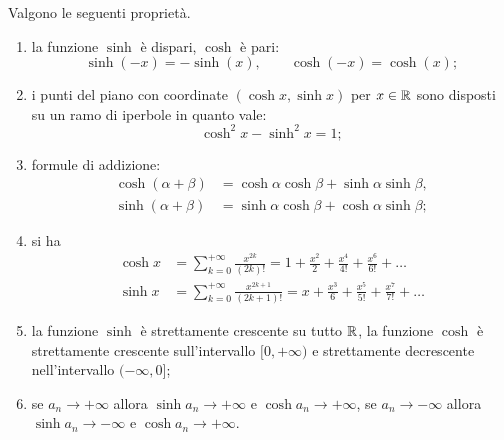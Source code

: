 \begin{theorem}
Valgono le seguenti proprietà.
\begin{enumerate}
\item
la funzione $\sinh$ è dispari, $\cosh$ è pari:
\[
\sinh(-x) = -\sinh(x),
\qquad
\cosh(-x) = \cosh(x);
\]

\item
i punti del piano con coordinate $(\cosh x, \sinh x)$
per $x\in \mathbb R$
sono disposti su un ramo di iperbole in quanto vale:
\[
  \cosh^2 x - \sinh^2 x = 1;
\]

\item formule di addizione:
\begin{align*}
  \cosh(\alpha+\beta) &= \cosh \alpha \cosh \beta + \sinh \alpha \sinh \beta,\\
  \sinh(\alpha+\beta) &= \sinh \alpha \cosh \beta + \cosh \alpha \sinh \beta;
\end{align*}

\item si ha
\begin{align*}
 \cosh x
 &= \sum_{k=0}^{+\infty} \frac{x^{2k}}{(2k)!}
 = 1 + \frac{x^2}{2} + \frac{x^4}{4!} + \frac{x^6}{6!} + \dots \\
 \sinh x
 &= \sum_{k=0}^{+\infty} \frac{x^{2k+1}}{(2k+1)!}
 = x + \frac{x^3}{6} + \frac{x^5}{5!} + \frac{x^7}{7!} + \dots
\end{align*}

\item
la funzione $\sinh$ è strettamente crescente su tutto $\mathbb R$,
la funzione $\cosh$
è strettamente crescente sull'intervallo
$[0,+\infty)$ e strettamente decrescente
nell'intervallo $(-\infty,0]$;

\item
se $a_n\to +\infty$ allora $\sinh a_n \to +\infty$ e $\cosh a_n \to +\infty$,
se $a_n\to -\infty$ allora $\sinh a_n \to -\infty$ e $\cosh a_n \to +\infty$.

\end{enumerate}
\end{theorem}
%
